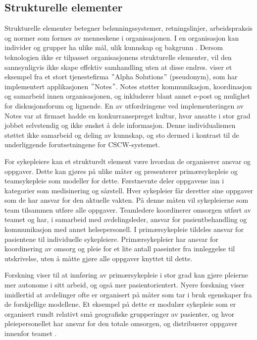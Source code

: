 \subsection{Strukturelle elementer}
\label{sec:strukturelle_elementer}
Strukturelle elementer betegner belønningssystemer, retningslinjer, arbeidspraksis og normer som formes av menneskene i organisasjonen. I en organisasjon kan individer og grupper ha ulike mål, ulik kunnskap og bakgrunn \citep{Ackermann00}. Dersom teknologien ikke er tilpasset organisasjonens strukturelle elementer, vil den sannsynligvis ikke skape effektiv samhandling uten at disse endres. \citet{Orlikowski92} viser et eksempel fra et stort tjenestefirma $"$Alpha Solutions$"$ (pseudonym), som har implementert applikasjonen $"$Notes$"$. Notes støtter kommunikasjon, koordinasjon og samarbeid innen organisasjonen, og inkluderer blant annet e-post og mulighet for diskusjonsforum og lignende. En av utfordringene ved implementeringen av Notes var at firmaet hadde en konkurransepreget kultur, hvor ansatte i stor grad jobbet selvstendig og ikke ønsket å dele informasjon. Denne individualismen støttet ikke samarbeid og deling av kunnskap, og sto dermed i kontrast til de underliggende forutsetningene for CSCW-systemet. 


\noindent
For sykepleiere kan et strukturelt element være hvordan de organiserer ansvar og oppgaver. Dette kan gjøres på ulike måter og \citet{Rygh13} presenterer primærsykepleie og teamsykepleie som modeller for dette. Førstnevnte deler oppgavene inn i kategorier som medisinering og sårstell. Hver sykepleier får deretter sine oppgaver som de har ansvar for den aktuelle vakten. På denne måten vil sykepleierne som team tilsammen utføre alle oppgaver. Teamledere koordinerer omsorgen utført av teamet og har, i samarbeid med avdelingsleder, ansvar for pasientbehandling og kommunikasjon med annet helsepersonell. I primærsykepleie tildeles ansvar for pasientene til individuelle sykepleiere. Primærsykepleier har ansvar for koordinering av omsorg og pleie for et lite antall paseinter fra innleggelse til utskrivelse, uten å måtte gjøre alle oppgaver knyttet til dette. 

\noindent
Forskning viser til at innføring av primærsykepleie i stor grad kan gjøre pleierne mer autonome i sitt arbeid, og også mer pasientorientert. Nyere forskning viser imidlertid at avdelinger ofte er organisert på måter som tar i bruk egenskaper fra de forskjellige modellene. Et eksempel på dette er modulær sykepleie som er organisert rundt relativt små geografiske grupperinger av pasienter, og hvor pleiepersonellet har ansvar for den totale omsorgen, og distribuerer oppgaver innenfor teamet \citep{Rygh13}.

